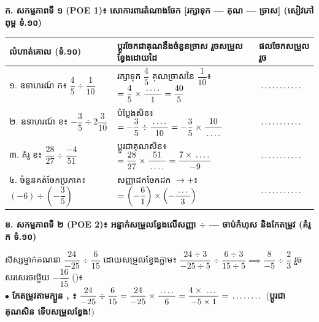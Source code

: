 \documentclass[a4paper,10pt]{article}
\newcommand{\en}[1]{{\TimesEn #1}}
\newcommand{\cnum}[1]{\mbox{\fontsize{10pt}{12pt}\selectfont\ding{\numexpr181+#1\relax}}}
\newcommand{\blank}[1][1.5cm]{\makebox[#1]{\dotfill}}
\begin{document}
\vspace{3.5pt}
\textbf{ក. សកម្មភាពទី ១ (\en{POE 1})៖ សោការពារតំណាងចែក \textbf{[រក្សាទុក — គុណ — ច្រាស]} (សៀវភៅពុម្ព ទំ.១០)}

{\renewcommand{\arraystretch}{1.60}
\begin{tabular}{|L{4.80cm}|L{8.80cm}|C{4.20cm}|}
  \hline
  \textbf{លំហាត់គោល (ទំ.១០)} & \textbf{ប្ដូរចែកជាគុណនឹងចំនួនច្រាស រួចសម្រួលខ្វែងដោយដៃ} & \textbf{ផលចែកសម្រួលរួច} \\
  \hline
  \rule[-10pt]{0pt}{26pt}១. ឧទាហរណ៍ ក៖ $\dfrac{4}{5}\div\dfrac{1}{10}$ & រក្សាទុក $\dfrac{4}{5}$ គុណច្រាសនៃ $\dfrac{1}{10}$៖ $=\dfrac{4}{5}\times\dfrac{\blank[0.7cm]}{1} = \dfrac{40}{5}$ & $\blank[1.8cm]$ \\
  \hline
  \rule[-10pt]{0pt}{26pt}២. ឧទាហរណ៍ ខ៖ $-\dfrac{3}{5}\div 2\dfrac{3}{10}$ & បំប្លែងសិន៖ $=-\dfrac{3}{5}\div\dfrac{\blank[0.7cm]}{10} = -\dfrac{3}{5}\times\dfrac{10}{\blank[0.7cm]}$ & $\blank[1.8cm]$ \\
  \hline
  \rule[-10pt]{0pt}{26pt}៣. គំរូ ខ៖ $\dfrac{28}{27}\div\dfrac{-4}{51}$ & ប្ដូរជាគុណសិន៖ $=\dfrac{28}{27}\times\dfrac{51}{\blank[0.7cm]} = \dfrac{7\times\blank[0.7cm]}{-9}$ & $\blank[1.8cm]$ \\
  \hline
  \rule[-10pt]{0pt}{26pt}៤. ចំនួនគត់ចែកប្រភាគ៖ $(-6)\div\left(-\dfrac{3}{5}\right)$ & សញ្ញាដកចែកដក $\to +$៖ $=\left(-\dfrac{6}{1}\right)\times\left(-\dfrac{\blank[0.6cm]}{3}\right)$ & $\blank[1.8cm]$ \\
  \hline
\end{tabular}}

\vspace{4pt}
\textbf{ខ. សកម្មភាពទី ២ (\en{POE 2})៖ អន្ទាក់សម្រួលខ្វែងលើសញ្ញា $\div$ — ចាប់កំហុស និងកែតម្រូវ (គំរូ ក ទំ.១០)}

\begin{tcolorbox}[enhanced, sharp corners, colback=white, colframe=black, boxrule=0.7pt, boxsep=2pt, top=2.5pt, bottom=2.5pt, left=5pt, right=5pt]
  សិស្សម្នាក់គណនា $\dfrac{24}{-25}\div\dfrac{6}{15}$ ដោយសម្រួលខ្វែងភ្លាម៖ $\dfrac{24\div 3}{-25\div 5}\div\dfrac{6\div 3}{15\div 5} \implies \dfrac{8}{-5}\div\dfrac{2}{3}$ រួចសរសេរចម្លើយ $-\dfrac{16}{15}$ ()៖\\[3pt]
  $\bullet$ \textbf{កែតម្រូវតាមក្បួន \cnum{1}, \cnum{2}៖} $\dfrac{24}{-25}\div\dfrac{6}{15} = \dfrac{24}{-25}\times\dfrac{\blank[0.7cm]}{6} = \dfrac{4\times\blank[0.6cm]}{-5\times 1} = \blank[1.3cm]$ (\textbf{ប្ដូរជាគុណសិន ទើបសម្រួលខ្វែង!})
\end{tcolorbox}
\end{document}
